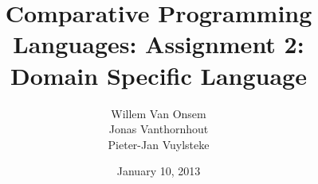 \documentclass[titlepage]{article}
\title{Comparative Programming Languages: Assignment 2:\\Domain Specific
Language}
\author{Willem Van Onsem\\Jonas Vanthornhout\\Pieter-Jan Vuylsteke}
\date{January 10, 2013}
\begin{document}
\begin{titlepage}
\maketitle
\end{titlepage}
\tableofcontents






\appendix

\end{document}
